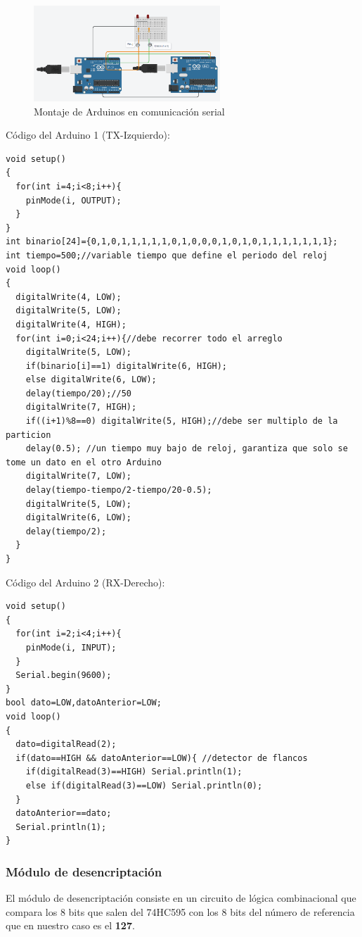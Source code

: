 \documentclass{article}
\begin{document}
\begin{figure}[!ht] 
\includegraphics[width=7cm]{montajeSerial.PNG}
\centering
\caption{Montaje de Arduinos en comunicación serial}
\end{figure}

\noindent
Código del Arduino 1 (TX-Izquierdo):

\begin{lstlisting}[style=C++]
void setup()
{
  for(int i=4;i<8;i++){
  	pinMode(i, OUTPUT);
  }  
}
int binario[24]={0,1,0,1,1,1,1,1,0,1,0,0,0,1,0,1,0,1,1,1,1,1,1,1};
int tiempo=500;//variable tiempo que define el periodo del reloj
void loop()
{
  digitalWrite(4, LOW);
  digitalWrite(5, LOW);
  digitalWrite(4, HIGH);
  for(int i=0;i<24;i++){//debe recorrer todo el arreglo
    digitalWrite(5, LOW);
    if(binario[i]==1) digitalWrite(6, HIGH);
    else digitalWrite(6, LOW);
    delay(tiempo/20);//50
    digitalWrite(7, HIGH);
    if((i+1)%8==0) digitalWrite(5, HIGH);//debe ser multiplo de la particion
    delay(0.5); //un tiempo muy bajo de reloj, garantiza que solo se tome un dato en el otro Arduino
    digitalWrite(7, LOW);
    delay(tiempo-tiempo/2-tiempo/20-0.5);
    digitalWrite(5, LOW);
    digitalWrite(6, LOW);
    delay(tiempo/2); 
  }
}
\end{lstlisting}

\noindent
Código del Arduino 2 (RX-Derecho):

\begin{lstlisting}[style=C++]
void setup()
{
  for(int i=2;i<4;i++){
  	pinMode(i, INPUT);
  } 
  Serial.begin(9600);
}
bool dato=LOW,datoAnterior=LOW;
void loop()
{
  dato=digitalRead(2);
  if(dato==HIGH && datoAnterior==LOW){ //detector de flancos
  	if(digitalRead(3)==HIGH) Serial.println(1);
    else if(digitalRead(3)==LOW) Serial.println(0);
  }
  datoAnterior==dato;
  Serial.println(1);
}
\end{lstlisting}

\subsubsection{Módulo de desencriptación}
El módulo de desencriptación consiste en un circuito de lógica combinacional que compara los 8 bits que salen del 74HC595 con los 8 bits del número de referencia que en nuestro caso es el \textbf{127}.\\
\end{document}

